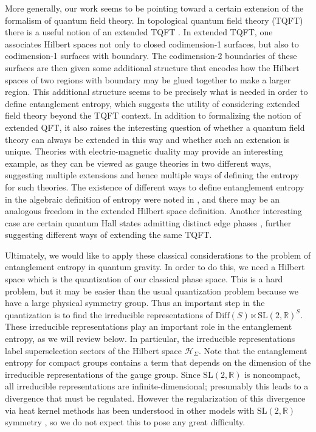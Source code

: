 \documentclass[a4paper,11pt]{article}
\newcommand{\slr}{\text{SL}(2,\mathbb{R})}
\begin{document}
More generally, our work seems to be pointing toward a certain extension of the formalism of quantum field theory.
In topological quantum field theory (TQFT) there is a useful notion of an extended TQFT \cite{Baez1995}.
In extended TQFT, one associates Hilbert spaces not only to closed codimension-1 surfaces, but also to codimension-1 surfaces with boundary.
The codimension-2 boundaries of these surfaces are then given some additional structure that encodes how the Hilbert spaces of two regions with boundary may be glued together to make a larger region.
This additional structure seems to be precisely what is needed in order to define entanglement entropy, which suggests the utility of considering extended field theory beyond the TQFT context.
In addition to formalizing the notion of extended QFT, it also raises the interesting question of whether a quantum field theory can always be extended in this way and whether such an extension is unique.
Theories with electric-magnetic duality may provide an interesting example, as they can be viewed as gauge theories in two different ways, suggesting multiple extensions and hence multiple ways of defining the entropy for such theories.
The existence of different ways to define entanglement entropy in the algebraic definition of entropy were noted in \cite{Casini:2013rba}, and there may be an analogous freedom in the extended Hilbert space definition.
Another interesting case are certain quantum Hall states admitting distinct edge phases \cite{Cano:2013ooa}, further suggesting different ways of extending the same TQFT.


Ultimately, we would like to apply these classical considerations to the problem of entanglement entropy in quantum gravity.
In order to do this, we need a Hilbert space which is the quantization of our classical phase space.
This is a hard problem, but it may be easier than the usual quantization problem because we have a large physical symmetry group.
Thus an important step in the quantization is to find the irreducible representations of $\text{Diff}(S) \ltimes \slr^S$.
These irreducible representations play an important role in the entanglement entropy, as we will review below.
In particular, the irreducible representations label superselection sectors of the Hilbert space $\mathcal{H}_\Sigma$.
Note that the entanglement entropy for compact groups contains a term that depends on the dimension of the irreducible representations of the gauge group.
Since $\slr$ is noncompact, all irreducible representations are infinite-dimensional; presumably this leads to a divergence that must be regulated.
However the regularization of this divergence via heat kernel methods has been understood in other models with $\slr$ symmetry \cite{Gupta:2014hxa}, so we do not expect this to pose any great difficulty.
\end{document}
